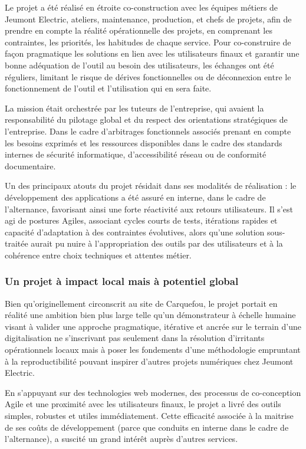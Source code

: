 \documentclass[11pt,a4paper]{article}
\begin{document}
Le projet a été réalisé en étroite co-construction avec les équipes métiers de Jeumont Electric, ateliers, maintenance, production, et chefs de projets, afin de prendre en compte la réalité opérationnelle des projets, en comprenant les contraintes, les priorités, les habitudes de chaque service. Pour co-construire de façon pragmatique les solutions en lien avec les utilisateurs finaux et garantir une bonne adéquation de l’outil au besoin des utilisateurs, les échanges ont été réguliers, limitant le risque de dérives fonctionnelles ou de déconnexion entre le fonctionnement de l’outil et l’utilisation qui en sera faite.

La mission était orchestrée par les tuteurs de l’entreprise, qui avaient la responsabilité du pilotage global et du respect des orientations stratégiques de l’entreprise. Dans le cadre d’arbitrages fonctionnels associés prenant en compte les besoins exprimés et les ressources disponibles dans le cadre des standards internes de sécurité informatique, d’accessibilité réseau ou de conformité documentaire.

Un des principaux atouts du projet résidait dans ses modalités de réalisation : le développement des applications a été assuré en interne, dans le cadre de l’alternance, favorisant ainsi une forte réactivité aux retours utilisateurs. Il s’est agi de postures Agiles, associant cycles courts de tests, itérations rapides et capacité d’adaptation à des contraintes évolutives, alors qu’une solution sous-traitée aurait pu nuire à l’appropriation des outils par des utilisateurs et à la cohérence entre choix techniques et attentes métier.

\subsubsection{Un projet à impact local mais à potentiel global}

Bien qu’originellement circonscrit au site de Carquefou, le projet portait en réalité une ambition bien plus large telle qu’un démonstrateur à échelle humaine visant à valider une approche pragmatique, itérative et ancrée sur le terrain d’une digitalisation ne s’inscrivant pas seulement dans la résolution d’irritants opérationnels locaux mais à poser les fondements d’une méthodologie empruntant à la reproductibilité pouvant inspirer d’autres projets numériques chez Jeumont Electric.

En s’appuyant sur des technologies web modernes, des processus de co-conception Agile et une proximité avec les utilisateurs finaux, le projet a livré des outils simples, robustes et utiles immédiatement. Cette efficacité associée à la maitrise de ses coûts de développement (parce que conduits en interne dans le cadre de l’alternance), a suscité un grand intérêt auprès d’autres services.
\end{document}
